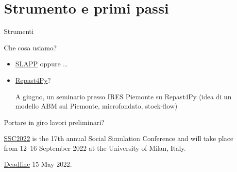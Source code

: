 \documentclass[9pt]{beamer}
\begin{document}
\section{Strumento e primi passi}

\begin{frame}{Strumenti}

Che cosa usiamo?

\begin{itemize}

\item
\href{https://terna.github.io/SLAPP/}{SLAPP} oppure \ldots

\item
\href{https://repast.github.io/repast4py.site/index.html}{Repast4Py}?

A giugno, un seminario presso IRES Piemonte su Repast4Py (idea di un modello ABM sul Piemonte, microfondato, stock-flow)

\end{itemize}

Portare in giro lavori preliminari?

\href{https://ssc2022.behavelab.org}{SSC2022} is the 17th annual Social Simulation Conference and will take place from 12--16 September 2022 at the University of Milan, Italy.

\href{https://ssc2022.behavelab.org/submissions/}{Deadline} 15 May 2022.

\end{frame}
\end{document}
